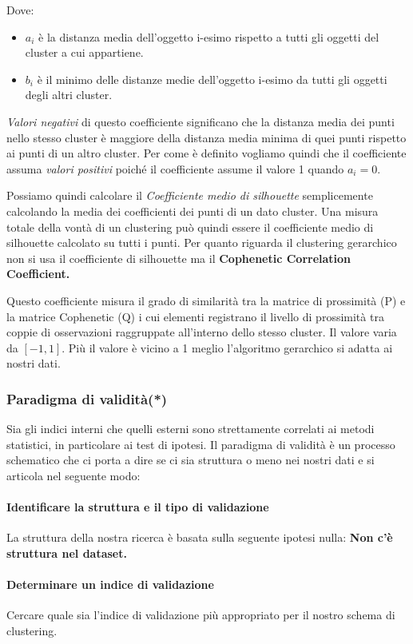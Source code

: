 Dove:
\begin{itemize}
	\item $a_{i}$ è la distanza media dell'oggetto i-esimo rispetto a tutti gli oggetti del cluster a cui appartiene.
	\item $b_{i}$ è il minimo delle distanze medie dell'oggetto i-esimo da tutti gli oggetti degli altri cluster.
\end{itemize}

\textit{Valori negativi} di questo coefficiente significano che la distanza media dei punti nello stesso cluster è maggiore della distanza media minima di quei punti rispetto ai punti di un altro cluster.  Per come è definito vogliamo quindi che il coefficiente assuma \textit{valori positivi} poiché il coefficiente assume il valore 1 quando $a_i = 0$.

Possiamo quindi calcolare il \textit{Coefficiente medio di silhouette} semplicemente calcolando la media dei coefficienti dei punti di un dato cluster. Una misura totale della vontà di un clustering può quindi essere il coefficiente medio di silhouette calcolato su tutti i punti.
Per quanto riguarda il clustering gerarchico non si usa il coefficiente di silhouette ma il \textbf{Cophenetic Correlation Coefficient.}

Questo coefficiente misura il grado di similarità tra la matrice di prossimità (P) e la matrice Cophenetic (Q) i cui elementi registrano il livello di prossimità tra coppie di osservazioni raggruppate all'interno dello stesso cluster.
 Il valore varia da $[-1,1]$. Più il valore è vicino a 1 meglio l'algoritmo gerarchico si adatta ai nostri dati.
 \subsubsection{Paradigma di validità(*)}

 Sia gli indici interni che quelli esterni sono strettamente correlati ai metodi statistici, in particolare ai test di ipotesi. Il paradigma di validità è un processo schematico che ci porta a dire se ci sia struttura o meno nei nostri dati e si articola nel seguente modo:
 
 \paragraph{Identificare la struttura e il tipo di validazione} La struttura della nostra ricerca è basata sulla seguente ipotesi nulla:
 \textbf{Non c'è struttura nel dataset.}
 \paragraph{Determinare un indice di validazione} Cercare quale sia l'indice di validazione più appropriato per il nostro schema di clustering.
